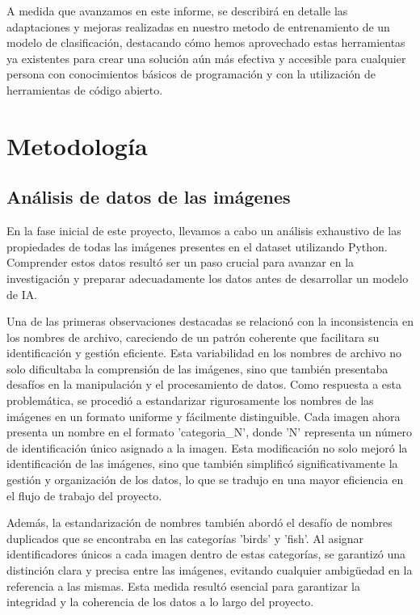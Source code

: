 \documentclass[journal]{IEEEtran}
\begin{document}
A medida que avanzamos en este informe, se describirá en detalle las adaptaciones y mejoras realizadas en nuestro metodo de entrenamiento de un modelo de clasificación, destacando cómo hemos aprovechado estas herramientas ya existentes para crear una solución aún más efectiva y accesible para cualquier persona con conocimientos básicos de programación y con la utilización de herramientas de código abierto.


\section{Metodología}
\subsection{Análisis de datos de las imágenes}
En la fase inicial de este proyecto, llevamos a cabo un análisis exhaustivo de las propiedades de todas las imágenes presentes en el dataset utilizando Python. Comprender estos datos resultó ser un paso crucial para avanzar en la investigación y preparar adecuadamente los datos antes de desarrollar un modelo de IA.

Una de las primeras observaciones destacadas se relacionó con la inconsistencia en los nombres de archivo, careciendo de un patrón coherente que facilitara su identificación y gestión eficiente. Esta variabilidad en los nombres de archivo no solo dificultaba la comprensión de las imágenes, sino que también presentaba desafíos en la manipulación y el procesamiento de datos. Como respuesta a esta problemática, se procedió a estandarizar rigurosamente los nombres de las imágenes en un formato uniforme y fácilmente distinguible. Cada imagen ahora presenta un nombre en el formato 'categoria\_N', donde 'N' representa un número de identificación único asignado a la imagen. Esta modificación no solo mejoró la identificación de las imágenes, sino que también simplificó significativamente la gestión y organización de los datos, lo que se tradujo en una mayor eficiencia en el flujo de trabajo del proyecto.

Además, la estandarización de nombres también abordó el desafío de nombres duplicados que se encontraba en las categorías 'birds' y 'fish'. Al asignar identificadores únicos a cada imagen dentro de estas categorías, se garantizó una distinción clara y precisa entre las imágenes, evitando cualquier ambigüedad en la referencia a las mismas. Esta medida resultó esencial para garantizar la integridad y la coherencia de los datos a lo largo del proyecto.
\end{document}
